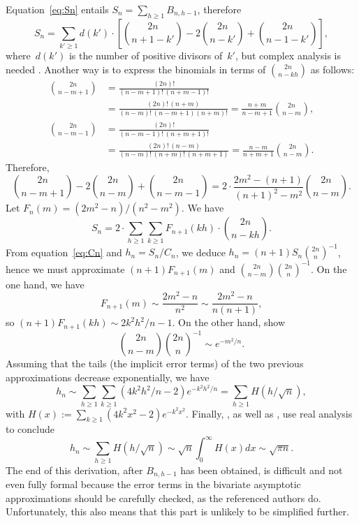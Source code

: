Equation~\eqref{eq:Sn} entails \(S_{n} = \sum_{h \geqslant 1}
B_{n,h-1}\), therefore
\begin{equation*}
S_{n} = \sum_{k' \geqslant 1}d(k') \cdot
         \left[\binom{2n}{n+1-k'} - 2\binom{2n}{n-k'}
         + \binom{2n}{n-1-k'}\right],
\end{equation*}
where~\(d(k')\) is the number of positive divisors of~\(k'\), but
complex analysis is needed
\citep{KnuthdeBruijnRice_1972,FlajoletGourdonDumas_1995}. Another way
is to express the binomials in terms of \(\binom{2n}{n-kh}\) as
follows:
\begin{align*}
\binom{2n}{n-m+1} &= \frac{(2n)!}{(n-m+1)!\,(n+m-1)!}\\
                  &= \frac{(2n)!\,(n+m)}{(n-m)!\,(n-m+1)(n+m)!}
                   = \frac{n+m}{n-m+1}\binom{2n}{n-m},\\
\binom{2n}{n-m-1} &= \frac{(2n)!}{(n-m-1)!\,(n+m+1)!}\\
                  &= \frac{(2n)!\,(n-m)}{(n-m)!\,(n+m)!\,(n+m+1)}
                   = \frac{n-m}{n+m+1}\binom{2n}{n-m}.
\end{align*}
Therefore,
\begin{equation*}
\binom{2n}{n-m+1} - 2\binom{2n}{n-m} + \binom{2n}{n-m-1}
= 2 \cdot \frac{2m^2-(n+1)}{(n+1)^2-m^2}\binom{2n}{n-m}.
\end{equation*}
Let \(F_n(m) = (2m^2-n)/(n^2-m^2)\). We have
\begin{equation*}
S_{n} = 2 \cdot \sum_{h \geqslant 1}\sum_{k \geqslant 1} F_{n+1}(kh)
\cdot \binom{2n}{n-kh}.
\end{equation*}
From equation~\eqref{eq:Cn} and \(h_n = S_n/C_n\), we deduce \(h_{n} =
(n+1)S_{n}{\binom{2n}{n}}^{-1}\), hence we must approximate
\((n+1)F_{n+1}(m)\) and \(\binom{2n}{n-m}\binom{2n}{n}^{-1}\). On the
one hand, we have
\begin{equation*}
F_{n+1}(m) \sim \frac{2m^2-n}{n^2} \sim \frac{2m^2-n}{n(n+1)},
\end{equation*}
so \((n+1)F_{n+1}(kh) \sim 2k^2h^2\!/n-1\). On the other hand,
\citet*[4.6, 4.8]{SedgewickFlajolet_1996} show
\begin{equation*}
\binom{2n}{n-m}{\binom{2n}{n}}^{-1} \sim e^{-m^2\!/n}.
\end{equation*}
Assuming that the tails (the implicit error terms) of the two previous
approximations decrease exponentially, we have
\begin{equation*}
h_{n} \sim \sum_{h \geqslant 1}\sum_{k \geqslant 1}
(4k^2h^2\!/n - 2)e^{-k^2h^2\!/n}
= \sum_{h \geqslant 1}H(h/\!\sqrt{n}),
\end{equation*}
with \(H(x) := \sum_{k \geqslant 1}(4k^2x^2-2)e^{-k^2x^2}\). Finally,
\citet*[5.9]{SedgewickFlajolet_1996}, as well as
\citet*[9.6]{GrahamKnuthPatashnik_1994}, use real analysis to conclude
\begin{equation*}
h_{n} \sim \sum_{h \geqslant 1}H(h/\!\sqrt{n})
\sim \sqrt{n} \int_0^{\infty}\!\!H(x) dx \sim \sqrt{\pi n}.
\end{equation*}
The end of this derivation, after \(B_{n,h-1}\) has been obtained, is
difficult and not even fully formal because the error terms in the
bivariate asymptotic approximations should be carefully checked, as
the referenced authors do. Unfortunately, this also means that this
part is unlikely to be simplified further.
